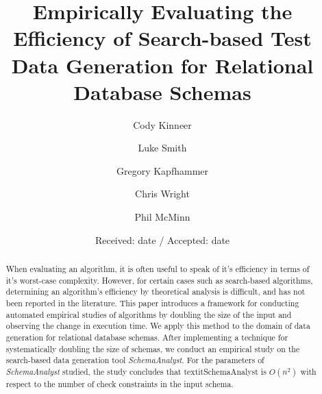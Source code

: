 \documentclass[smallextended]{svjour3}       %
\begin{document}
\title{Empirically Evaluating the Efficiency of Search-based Test Data
Generation for Relational Database Schemas}



\author{Cody Kinneer         \and
        Luke Smith \and
        Gregory Kapfhammer \and
        Chris Wright \and
        Phil McMinn
}



\date{Received: date / Accepted: date}

\maketitle

\begin{abstract}
When evaluating an algorithm, it is often useful to speak of it's
efficiency in terms of it's worst-case complexity.  However, for certain
cases such as search-based algorithms, determining an algorithm's
efficiency by theoretical analysis is difficult, and has not been
reported in the literature. This paper introduces a
framework for conducting automated empirical studies of algorithms by
doubling the size of the input and observing the change in execution
time. We apply this method to the domain of data generation for
relational database schemas.  After implementing a technique for 
systematically doubling the size of schemas, we conduct an
empirical study on the search-based data generation tool
\textit{SchemaAnalyst}. For the parameters of \textit{SchemaAnalyst}
studied, the study concludes that textit{SchemaAnalyst} is $O(n^2)$
with respect to the number of check constraints in the input schema.

\end{abstract}









\end{document}
